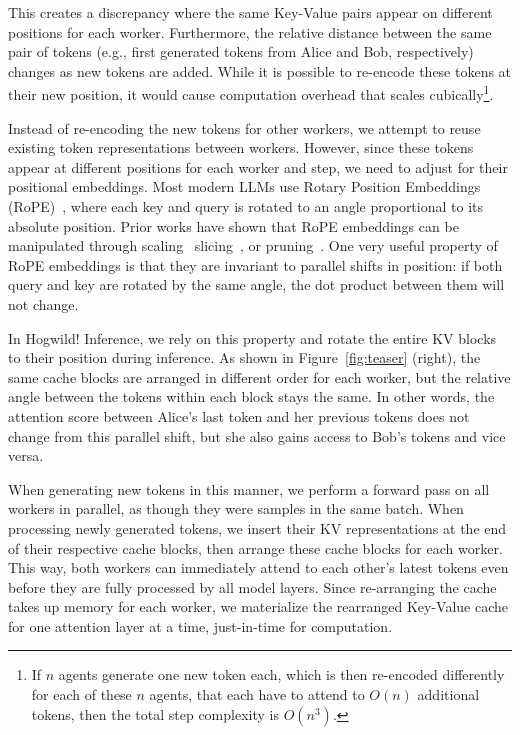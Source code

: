 This creates a discrepancy where the same Key-Value pairs appear on different positions for each worker. Furthermore, the relative distance between the same pair of tokens (e.g., first generated tokens from Alice and Bob, respectively) changes as new tokens are added. While it is possible to re-encode these tokens at their new position, it would cause computation overhead that scales cubically\footnote[4]{If $n$ agents generate one new token each, which is then re-encoded differently for each of these $n$ agents, that each have to attend to $O(n)$ additional tokens, then the total step complexity is $O(n^3)$.}.

Instead of re-encoding the new tokens for other workers, we attempt to reuse existing token representations between workers. However, since these tokens appear at different positions for each worker and step, we need to adjust for their positional embeddings.
Most modern LLMs use Rotary Position Embeddings (RoPE)~\citep{su2021roformer}, where each key and query is rotated to an angle proportional to its absolute position. Prior works have shown that RoPE embeddings can be manipulated through scaling~\citep{rope_scaling} slicing~\citep{streamingllm}, or pruning~\citep{zhang2023h2o}. One very useful property of RoPE embeddings is that they are invariant to parallel shifts in position: if both query and key are rotated by the same angle, the dot product between them will not change. 

In Hogwild!\! Inference, we rely on this property and rotate the entire KV blocks to their position during inference. As shown in Figure~\ref{fig:teaser} (right), the same cache blocks are arranged in different order for each worker, but the relative angle between the tokens within each block stays the same. In other words, the attention score between Alice's last token and her previous tokens does not change from this parallel shift, but she also gains access to Bob's tokens and vice versa.

When generating new tokens in this manner, we perform a forward pass on all workers in parallel, as though they were samples in the same batch.
When processing newly generated tokens, we insert their KV representations at the end of their respective cache blocks, then arrange these cache blocks for each worker. This way, both workers can immediately attend to each other's latest tokens even before they are fully processed by all model layers.
Since re-arranging the cache takes up memory for each worker, we materialize the rearranged Key-Value cache for one attention layer at a time, just-in-time for computation.

